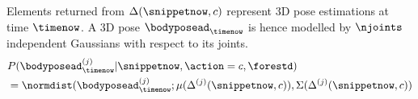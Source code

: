 Elements returned from $\Delta(\snippetnow, c)$ represent 3D pose estimations at time $\timenow$. A 3D pose $\bodyposead_{\timenow}$ is hence modelled by $\njoints$ independent Gaussians with respect to its joints. 
\begin{equation}
	\begin{split}
		& P( \bodyposead^{(j)}_{\timenow}| \snippetnow, \action = c,\forestd) \\ 
	 & = \normdist(\bodyposead^{(j)}_{\timenow}; \mu(\Delta^{(j)}(\snippetnow,c)), \Sigma(\Delta^{(j)}(\snippetnow,c))
\end{split} 
\end{equation}
